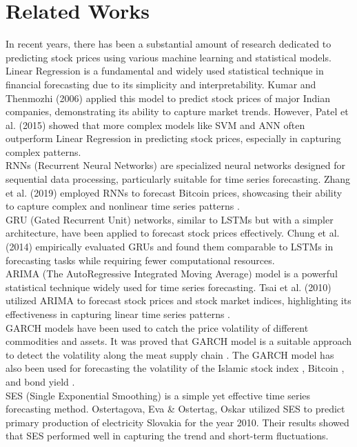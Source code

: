\documentclass{ieeeojies}
\begin{document}
\label{sec:introduction}

\section{Related Works}
In recent years, there has been a substantial amount of research dedicated to predicting stock prices using various machine learning and statistical models. \\
Linear Regression is a fundamental and widely used statistical technique in financial forecasting due to its simplicity and interpretability. Kumar and Thenmozhi (2006) \cite{b10} applied this model to predict stock prices of major Indian companies, demonstrating its ability to capture market trends. However, Patel et al. (2015) showed that more complex models like SVM and ANN often outperform Linear Regression in predicting stock prices, especially in capturing complex patterns.\\
RNNs (Recurrent Neural Networks) are specialized neural networks designed for sequential data processing, particularly suitable for time series forecasting. Zhang et al. (2019) \cite{b11} employed RNNs to forecast Bitcoin prices, showcasing their ability to capture complex and nonlinear time series patterns .\\
GRU (Gated Recurrent Unit) networks, similar to LSTMs but with a simpler architecture, have been applied to forecast stock prices effectively. Chung et al. (2014) \cite{b12} empirically evaluated GRUs and found them comparable to LSTMs in forecasting tasks while requiring fewer computational resources.\\
ARIMA (The AutoRegressive Integrated Moving Average) model is a powerful statistical technique widely used for time series forecasting. Tsai et al. (2010) \cite{b13} utilized ARIMA to forecast stock prices and stock market indices, highlighting its effectiveness in capturing linear time series patterns .\\
GARCH models have been used to catch the price volatility of different commodities and assets. It was proved that GARCH model is a suitable approach to detect the volatility along the meat supply chain \cite{b3}. The GARCH model has also been used for forecasting the volatility of the Islamic stock index \cite{b4}, Bitcoin \cite{b14}, and bond yield \cite{b6}.\\
SES (Single Exponential Smoothing) is a simple yet effective time series forecasting method. Ostertagova, Eva \& Ostertag, Oskar \cite{b30} utilized SES to predict primary production of electricity Slovakia for the year 2010. Their results showed that SES performed well in capturing the trend and short-term fluctuations.\\
\end{document}
